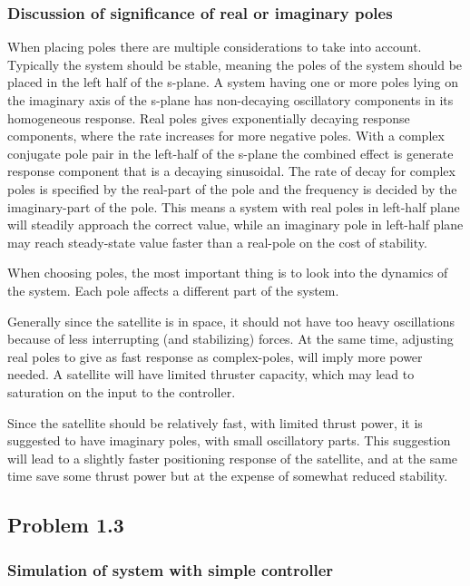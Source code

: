\subsubsection*{Discussion of significance of real or imaginary poles}

When placing poles there are multiple considerations to take into account. Typically the system should be stable, meaning the poles of the system should be placed in the left half of the s-plane. A system having one or more poles lying on the imaginary axis of the s-plane has non-decaying oscillatory components in its homogeneous response. Real poles gives exponentially decaying response components, where the rate increases for more negative poles. With a complex conjugate pole pair in the left-half of the s-plane the combined effect is generate response component that is a decaying sinusoidal. The rate of decay for complex poles is specified by the real-part of the pole and the frequency is decided by the imaginary-part of the pole. This means a system with real poles in left-half plane will steadily approach the correct value, while an imaginary pole in left-half plane may reach steady-state value faster than a real-pole on the cost of stability.

When choosing poles, the most important thing is to look into the dynamics of the system. Each pole affects a different part of the system.  

Generally since the satellite is in space, it should not have too heavy oscillations because of less interrupting (and stabilizing) forces. At the same time, adjusting real poles to give as fast response as complex-poles, will imply more power needed. A satellite will have limited thruster capacity, which may lead to saturation on the input to the controller.

Since the satellite should be relatively fast, with limited thrust power, it is suggested to have imaginary poles, with small oscillatory parts. This suggestion will lead to a slightly faster positioning response of the satellite, and at the same time save some thrust power but at the expense of somewhat reduced stability.   

\subsection*{Problem 1.3}
\subsubsection*{Simulation of system with simple controller}

